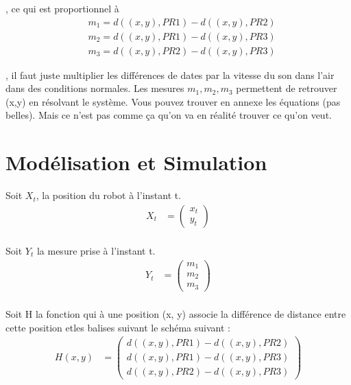 \documentclass[a4paper, 8pt]{article}
\begin{document}
, ce qui est proportionnel à
\begin{equation}\label{2}
		\begin{split}
		& m_{1} = d((x,y),PR1)-d((x,y),PR2)\\
		& m_{2} = d((x,y),PR1)-d((x,y),PR3)\\
		& m_{3} = d((x,y),PR2)-d((x,y),PR3)
		\end{split}
\end{equation}

, il faut juste multiplier les différences de dates par la vitesse du son dans l'air dans des conditions normales. Les mesures $m_{1}, m_{2},  m_{3}$ permettent de retrouver (x,y) en résolvant le système. Vous pouvez trouver en annexe les équations (pas belles). Mais ce n'est pas comme ça qu'on va en réalité trouver ce qu'on veut.


\section{Modélisation et Simulation}

Soit $X_t$, la position du robot à l'instant t.
\begin{equation}
	\begin{split}\label{3}
		X_t  &= \begin{pmatrix}
			x_t  \\
			y_t 
		\end{pmatrix}\\
	\end{split}
\end{equation}

Soit $Y_t$ la mesure prise à l'instant t.
\begin{equation} \label{4}
	\begin{split}
	Y_t &= \begin{pmatrix}
			m_1  \\
			m_2  \\
			m_3
		\end{pmatrix}\\
	\end{split}
\end{equation}

Soit H la fonction qui à une position (x, y) associe la différence de distance entre cette position etles balises suivant le schéma suivant : 
\begin{equation}
	\begin{split}\label{5}
		H(x, y)  &= 
		\begin{pmatrix}
				d((x,y),PR1) - d((x,y),PR2)\\
				d((x,y),PR1) - d((x,y),PR3)\\
				d((x,y),PR2) - d((x,y),PR3)
		\end{pmatrix}\\
	\end{split}
\end{equation}
\end{document}
